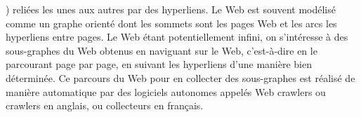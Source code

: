 ) reliées les unes aux autres par des hyperliens. 
Le Web est souvent modélisé comme un graphe orienté dont les sommets sont les pages Web et les arcs les hyperliens entre pages. 
Le Web étant potentiellement infini, on s'intéresse à des sous-graphes du Web obtenus en naviguant sur le Web, c'est-à-dire en le parcourant page par page, en suivant les hyperliens d'une manière bien déterminée. Ce parcours du Web pour en collecter des sous-graphes est réalisé de manière automatique par des logiciels 
autonomes appelés Web crawlers ou crawlers en anglais, ou collecteurs en français.
\newpage
